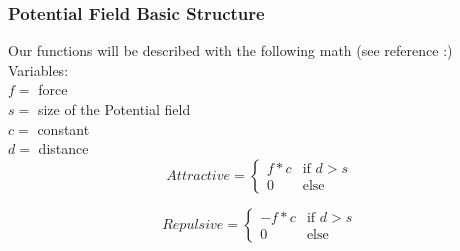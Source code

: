 		\subsubsection{Potential Field Basic Structure}
		Our functions will be described with the following math  (see reference \cite{ptlp}:) \\
		
		Variables:\\
		$f =$ force\\
		$s =$ size of the Potential field\\
		$c =$ constant\\
		$d =$ distance\\
		
		\begin{displaymath}
			Attractive = \begin{cases}
					f * c & \text{if $d > s$}\\
					0 & \text{else}
				\end{cases}		
		\end{displaymath}
			
		\begin{displaymath}
			Repulsive = \begin{cases}
					- f * c & \text{if $d > s$}\\
					0 & \text{else}
				\end{cases}		
		\end{displaymath}
		
		
